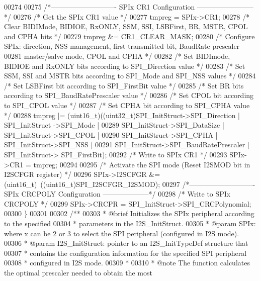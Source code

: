 \begin{DoxyCode}
00274 
00275 \textcolor{comment}{/*---------------------------- SPIx CR1 Configuration ------------------------*/}
00276   \textcolor{comment}{/* Get the SPIx CR1 value */}
00277   tmpreg = SPIx->CR1;
00278   \textcolor{comment}{/* Clear BIDIMode, BIDIOE, RxONLY, SSM, SSI, LSBFirst, BR, MSTR, CPOL and CPHA bits */}
00279   tmpreg &= CR1_CLEAR_MASK;
00280   \textcolor{comment}{/* Configure SPIx: direction, NSS management, first transmitted bit, BaudRate prescaler}
00281 \textcolor{comment}{     master/salve mode, CPOL and CPHA */}
00282   \textcolor{comment}{/* Set BIDImode, BIDIOE and RxONLY bits according to SPI\_Direction value */}
00283   \textcolor{comment}{/* Set SSM, SSI and MSTR bits according to SPI\_Mode and SPI\_NSS values */}
00284   \textcolor{comment}{/* Set LSBFirst bit according to SPI\_FirstBit value */}
00285   \textcolor{comment}{/* Set BR bits according to SPI\_BaudRatePrescaler value */}
00286   \textcolor{comment}{/* Set CPOL bit according to SPI\_CPOL value */}
00287   \textcolor{comment}{/* Set CPHA bit according to SPI\_CPHA value */}
00288   tmpreg |= (uint16\_t)((uint32\_t)SPI\_InitStruct->SPI_Direction | SPI\_InitStruct
      ->SPI_Mode |
00289                   SPI\_InitStruct->SPI_DataSize | SPI\_InitStruct->SPI_CPOL |
00290                   SPI\_InitStruct->SPI_CPHA | SPI\_InitStruct->SPI_NSS |
00291                   SPI\_InitStruct->SPI_BaudRatePrescaler | SPI\_InitStruct->
      SPI_FirstBit);
00292   \textcolor{comment}{/* Write to SPIx CR1 */}
00293   SPIx->CR1 = tmpreg;
00294 
00295   \textcolor{comment}{/* Activate the SPI mode (Reset I2SMOD bit in I2SCFGR register) */}
00296   SPIx->I2SCFGR &= (uint16\_t)~((uint16\_t)SPI_I2SCFGR_I2SMOD);
00297 \textcolor{comment}{/*---------------------------- SPIx CRCPOLY Configuration --------------------*/}
00298   \textcolor{comment}{/* Write to SPIx CRCPOLY */}
00299   SPIx->CRCPR = SPI\_InitStruct->SPI\_CRCPolynomial;
00300 \}
00301 
00302 \textcolor{comment}{/**}
00303 \textcolor{comment}{  * @brief  Initializes the SPIx peripheral according to the specified }
00304 \textcolor{comment}{  *         parameters in the I2S\_InitStruct.}
00305 \textcolor{comment}{  * @param  SPIx: where x can be  2 or 3 to select the SPI peripheral (configured in I2S mode).}
00306 \textcolor{comment}{  * @param  I2S\_InitStruct: pointer to an I2S\_InitTypeDef structure that}
00307 \textcolor{comment}{  *         contains the configuration information for the specified SPI peripheral}
00308 \textcolor{comment}{  *         configured in I2S mode.}
00309 \textcolor{comment}{  *           }
00310 \textcolor{comment}{  * @note   The function calculates the optimal prescaler needed to obtain the most }

\end{DoxyCode}
